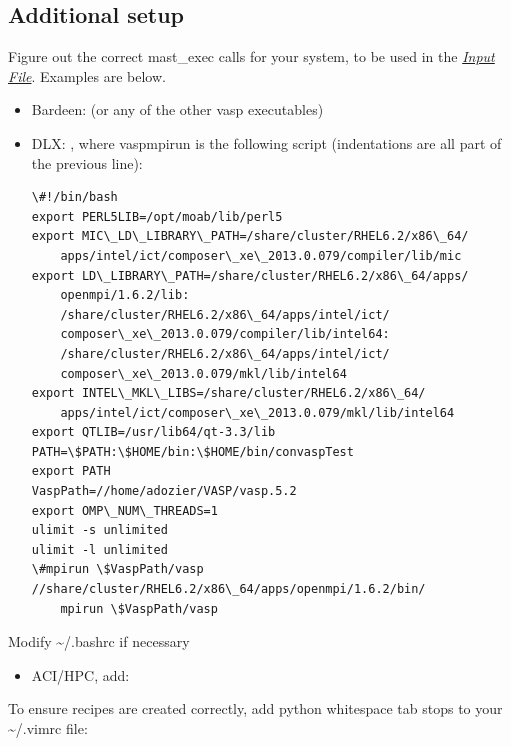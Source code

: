 \documentclass[letterpaper,10pt,english]{sphinxmanual}
\begin{document}
\subsection{Additional setup}
\label{1_0_installation:additional-setup}
Figure out the correct mast\_exec calls for your system, to be used in the {\hyperref[3_0_inputfile::doc]{\emph{Input File}}}. Examples are below.
\begin{itemize}
\item {} 
Bardeen:   (or any of the other vasp executables)

\item {} 
DLX: , where vaspmpirun is the following script (indentations are all part of the previous line):

\begin{Verbatim}[commandchars=\\\{\}]
\#!/bin/bash
export PERL5LIB=/opt/moab/lib/perl5
export MIC\_LD\_LIBRARY\_PATH=/share/cluster/RHEL6.2/x86\_64/
    apps/intel/ict/composer\_xe\_2013.0.079/compiler/lib/mic
export LD\_LIBRARY\_PATH=/share/cluster/RHEL6.2/x86\_64/apps/
    openmpi/1.6.2/lib:
    /share/cluster/RHEL6.2/x86\_64/apps/intel/ict/
    composer\_xe\_2013.0.079/compiler/lib/intel64:
    /share/cluster/RHEL6.2/x86\_64/apps/intel/ict/
    composer\_xe\_2013.0.079/mkl/lib/intel64
export INTEL\_MKL\_LIBS=/share/cluster/RHEL6.2/x86\_64/
    apps/intel/ict/composer\_xe\_2013.0.079/mkl/lib/intel64
export QTLIB=/usr/lib64/qt-3.3/lib
PATH=\$PATH:\$HOME/bin:\$HOME/bin/convaspTest
export PATH
VaspPath=//home/adozier/VASP/vasp.5.2
export OMP\_NUM\_THREADS=1
ulimit -s unlimited
ulimit -l unlimited
\#mpirun \$VaspPath/vasp
//share/cluster/RHEL6.2/x86\_64/apps/openmpi/1.6.2/bin/
    mpirun \$VaspPath/vasp
\end{Verbatim}

\end{itemize}

Modify \textasciitilde{}/.bashrc if necessary
\begin{itemize}
\item {} 
ACI/HPC, add: 

\end{itemize}

To ensure recipes are created correctly, add python whitespace tab stops to your \textasciitilde{}/.vimrc file:
\end{document}
